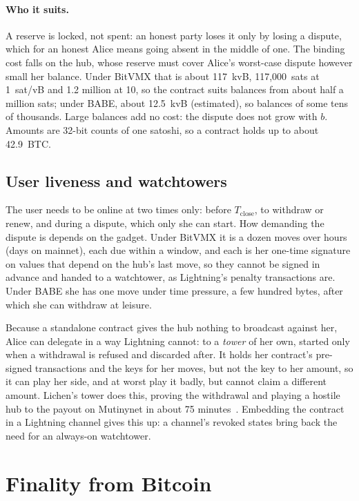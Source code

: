 \documentclass[11pt]{article}
\newcommand{\Tc}{T_{\mathrm{close}}}
\begin{document}
\paragraph{Who it suits.} A reserve is locked, not spent: an honest
party loses it only by losing a dispute, which for an honest Alice means
going absent in the middle of one. The binding cost falls on the hub,
whose reserve must cover Alice's worst-case dispute however small her
balance. Under BitVMX that is about 117~kvB, 117,000~sats at 1~sat/vB
and 1.2 million at 10, so the contract suits balances from about half a
million sats; under BABE, about 12.5~kvB (estimated), so balances of some
tens of thousands. Large balances add no cost: the dispute does not grow
with $b$. Amounts are 32-bit counts of one satoshi, so a contract holds
up to about 42.9~BTC.

\subsection{User liveness and watchtowers}
\label{sec:watch}

The user needs to be online at two times only: before $\Tc$, to withdraw or
renew, and during a dispute, which only she can start. How demanding the
dispute is depends on the gadget. Under BitVMX it is a dozen moves over
hours (days on mainnet), each due within a window, and each is her
one-time signature on values that depend on the hub's last move, so they
cannot be signed in advance and handed to a watchtower, as Lightning's
penalty transactions are. Under BABE she has one move under time
pressure, a few hundred bytes, after which she can withdraw at leisure.

Because a standalone contract gives the hub nothing to broadcast against
her, Alice can delegate in a way Lightning cannot: to a \emph{tower} of
her own, started only when a withdrawal is refused and discarded after.
It holds her contract's pre-signed transactions and the keys for her
moves, but not the key to her amount, so it can play her side, and at
worst play it badly, but cannot claim a different amount. Lichen's tower
does this, proving the withdrawal and playing a hostile hub to the payout
on Mutinynet in about 75 minutes~\cite[\S 10]{lichenbitvmx}. Embedding
the contract in a Lightning channel gives this up: a channel's revoked
states bring back the need for an always-on watchtower.

\section{Finality from Bitcoin}
\label{sec:finality}
\end{document}
